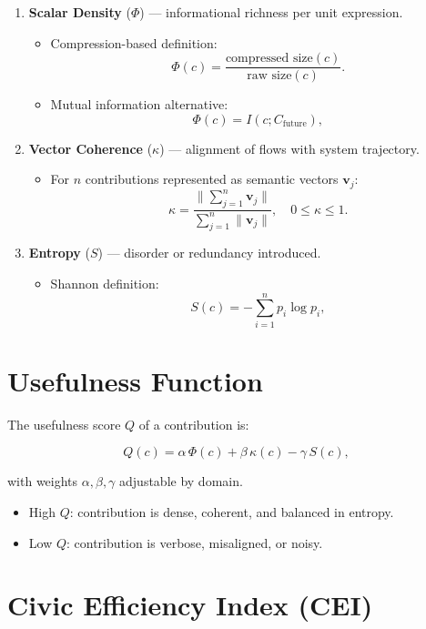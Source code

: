 \documentclass[openany]{book}
\begin{document}
\begin{enumerate}
    \item \textbf{Scalar Density} ($\Phi$) --- informational richness per unit expression.
    \begin{itemize}
        \item Compression-based definition:
        \[ \Phi(c) = \frac{\text{compressed size}(c)}{\text{raw size}(c)}. \]
        \item Mutual information alternative:
        \[ \Phi(c) = I(c; C_{\text{future}}), \]
    \end{itemize}
    \item \textbf{Vector Coherence} ($\kappa$) --- alignment of flows with system trajectory.
    \begin{itemize}
        \item For $n$ contributions represented as semantic vectors $\mathbf{v}_j$:
        \[ \kappa = \frac{\|\sum_{j=1}^n \mathbf{v}_j\|}{\sum_{j=1}^n \|\mathbf{v}_j\|}, \quad 0 \leq \kappa \leq 1. \]
    \end{itemize}
    \item \textbf{Entropy} ($S$) --- disorder or redundancy introduced.
    \begin{itemize}
        \item Shannon definition:
        \[ S(c) = -\sum_{i=1}^n p_i \log p_i, \]
    \end{itemize}
\end{enumerate}

\section{Usefulness Function}

The usefulness score $Q$ of a contribution is:

\[ Q(c) = \alpha \, \Phi(c) + \beta \, \kappa(c) - \gamma \, S(c), \]

with weights $\alpha, \beta, \gamma$ adjustable by domain.

\begin{itemize}
    \item High $Q$: contribution is dense, coherent, and balanced in entropy.
    \item Low $Q$: contribution is verbose, misaligned, or noisy.
\end{itemize}

\section{Civic Efficiency Index (CEI)}
\end{document}
